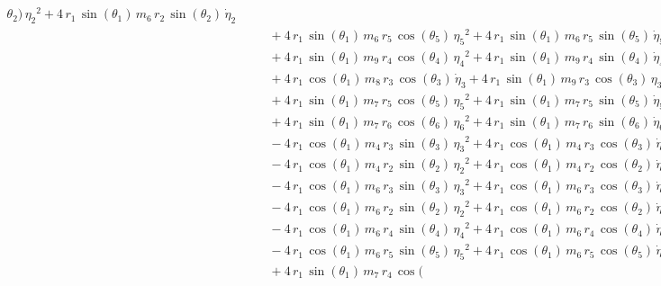 \begin{eqnarray*}
{\theta_{2}})\,{{\eta_{2}}}^2 + 4\,r_{1}\,\sin({\theta_{1}})\,m_{6}\,r
_{2}\,\sin({\theta_{2}})\,{\dot{\eta}_{2}} \\ &&\quad\mbox{} + 4\,r_{1
}\,\sin({\theta_{1}})\,m_{6}\,r_{5}\,\cos({\theta_{5}})\,{{\eta_{5}}}^
2 + 4\,r_{1}\,\sin({\theta_{1}})\,m_{6}\,r_{5}\,\sin({\theta_{5}})\,{
\dot{\eta}_{5}} \\ &&\quad\mbox{} + 4\,r_{1}\,\sin({\theta_{1}})\,m_{9
}\,r_{4}\,\cos({\theta_{4}})\,{{\eta_{4}}}^2 + 4\,r_{1}\,\sin({\theta
_{1}})\,m_{9}\,r_{4}\,\sin({\theta_{4}})\,{\dot{\eta}_{4}}
 \\ &&\quad\mbox{} + 4\,r_{1}\,\cos({\theta_{1}})\,m_{8}\,r_{3}\,\cos(
{\theta_{3}})\,{\dot{\eta}_{3}} + 4\,r_{1}\,\sin({\theta_{1}})\,m_{9}
\,r_{3}\,\cos({\theta_{3}})\,{{\eta_{3}}}^2 \\ &&\quad\mbox{} + 4\,r_{
1}\,\sin({\theta_{1}})\,m_{7}\,r_{5}\,\cos({\theta_{5}})\,{{\eta_{5}}}
^2 + 4\,r_{1}\,\sin({\theta_{1}})\,m_{7}\,r_{5}\,\sin({\theta_{5}})\,{
\dot{\eta}_{5}} \\ &&\quad\mbox{} + 4\,r_{1}\,\sin({\theta_{1}})\,m_{7
}\,r_{6}\,\cos({\theta_{6}})\,{{\eta_{6}}}^2 + 4\,r_{1}\,\sin({\theta
_{1}})\,m_{7}\,r_{6}\,\sin({\theta_{6}})\,{\dot{\eta}_{6}}
 \\ &&\quad\mbox{} - 4\,r_{1}\,\cos({\theta_{1}})\,m_{4}\,r_{3}\,\sin(
{\theta_{3}})\,{{\eta_{3}}}^2 + 4\,r_{1}\,\cos({\theta_{1}})\,m_{4}\,r
_{3}\,\cos({\theta_{3}})\,{\dot{\eta}_{3}} \\ &&\quad\mbox{} - 4\,r_{1
}\,\cos({\theta_{1}})\,m_{4}\,r_{2}\,\sin({\theta_{2}})\,{{\eta_{2}}}^
2 + 4\,r_{1}\,\cos({\theta_{1}})\,m_{4}\,r_{2}\,\cos({\theta_{2}})\,{
\dot{\eta}_{2}} \\ &&\quad\mbox{} - 4\,r_{1}\,\cos({\theta_{1}})\,m_{6
}\,r_{3}\,\sin({\theta_{3}})\,{{\eta_{3}}}^2 + 4\,r_{1}\,\cos({\theta
_{1}})\,m_{6}\,r_{3}\,\cos({\theta_{3}})\,{\dot{\eta}_{3}}
 \\ &&\quad\mbox{} - 4\,r_{1}\,\cos({\theta_{1}})\,m_{6}\,r_{2}\,\sin(
{\theta_{2}})\,{{\eta_{2}}}^2 + 4\,r_{1}\,\cos({\theta_{1}})\,m_{6}\,r
_{2}\,\cos({\theta_{2}})\,{\dot{\eta}_{2}} \\ &&\quad\mbox{} - 4\,r_{1
}\,\cos({\theta_{1}})\,m_{6}\,r_{4}\,\sin({\theta_{4}})\,{{\eta_{4}}}^
2 + 4\,r_{1}\,\cos({\theta_{1}})\,m_{6}\,r_{4}\,\cos({\theta_{4}})\,{
\dot{\eta}_{4}} \\ &&\quad\mbox{} - 4\,r_{1}\,\cos({\theta_{1}})\,m_{6
}\,r_{5}\,\sin({\theta_{5}})\,{{\eta_{5}}}^2 + 4\,r_{1}\,\cos({\theta
_{1}})\,m_{6}\,r_{5}\,\cos({\theta_{5}})\,{\dot{\eta}_{5}}
 \\ &&\quad\mbox{} + 4\,r_{1}\,\sin({\theta_{1}})\,m_{7}\,r_{4}\,\cos(

\end{eqnarray*}
